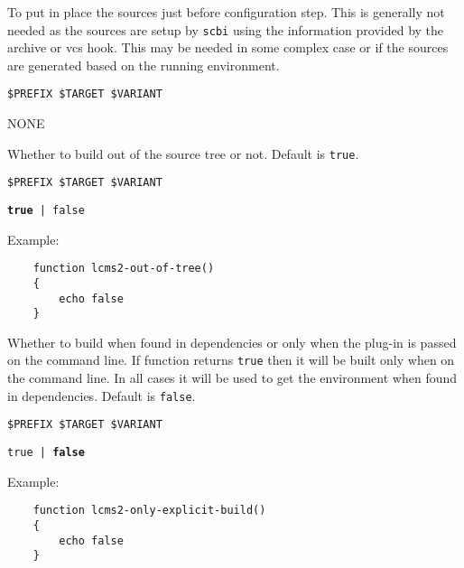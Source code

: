 \documentclass[a4paper,12pt,twoside]{article}
\newcommand{\code}[1]{\texttt{#1}}
\begin{document}
\begin{description}[font=\large\texttt]
	\item[<module>{[}-<variant>{]}-setup] To put in place the sources just before configuration step. This is generally not needed as the sources are setup by \code{scbi} using the information provided by the archive or vcs hook. This may be needed in some complex case or if the sources are generated based on the running environment.
	\begin{description}[font=\textit,style=standard]
		\item[parameter] \tabto{2cm} \code{\$PREFIX \$TARGET \$VARIANT}
		\item[return] \tabto{2cm} NONE
	\end{description}

	\item[<module>{[}-<variant>{]}-out-of-tree] Whether to build out of the source tree or not. Default is \code{true}.
	\begin{description}[font=\textit,style=standard]
		\item[parameter] \tabto{2cm} \code{\$PREFIX \$TARGET \$VARIANT}
		\item[return] \tabto{2cm} \code{\textbf{true} | false}
	\end{description}

	Example:
	\begin{lstlisting}
	function lcms2-out-of-tree()
	{
		echo false
	}
	\end{lstlisting}

	\item[<module>{[}-<variant>{]}-only-explicit-build] Whether to build when found in dependencies or only when the plug-in is passed on the command line. If function returns \code{true} then it will be built only when on the command line. In all cases it will be used to get the environment when found in dependencies. Default is \code{false}.
	\begin{description}[font=\textit,style=standard]
		\item[parameter] \tabto{2cm} \code{\$PREFIX \$TARGET \$VARIANT}
		\item[return] \tabto{2cm} \code{true | \textbf{false}}
	\end{description}

	Example:
	\begin{lstlisting}
	function lcms2-only-explicit-build()
	{
		echo false
	}
	\end{lstlisting}


\end{description}
\end{document}
